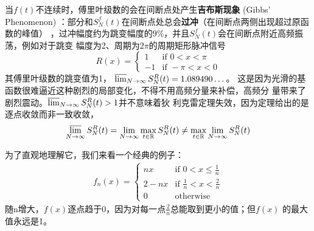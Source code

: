 \documentclass{ctexbook}
\begin{document}
当$f(t)$不连续时，傅里叶级数的会在间断点处产生\textbf{吉布斯现象} (Gibbs' Phenomenon)
：部分和$S_N^f(t)$在间断点处总会\textbf{过冲}（在间断点两侧出现超过原函数的峰值）
，过冲幅度约为跳变幅度的9\%，并且$S_N^f(t)$会在间断点附近高频振荡，例如对于跳变
幅度为2、周期为$2\pi$的周期矩形脉冲信号
\[R(x) =
    \begin{cases}
        1  & \text{if } 0<x<\pi  \\
        -1 & \text{if } -\pi<x<0
    \end{cases}\]
其傅里叶级数的跳变值为1，
$\varlimsup_{N \to \infty}S_N^R(t)=1.089490 \dots$。
这是因为光滑的基函数很难逼近这种剧烈的局部变化，不得不用高频分量来补偿，高频分
量带来了剧烈震动。$\varlimsup_{N \to \infty}S_N^R(t)>1$并不意味着狄
利克雷定理失效，因为定理给出的是逐点收敛而非一致收敛，
\[\varlimsup_{N \to \infty}S_N^R(t)=\lim_{N \to \infty}\max_{t\in \mathbb{R} }S_N^R(t)\neq \max_{t\in\mathbb{R}}\lim_{N\to\infty}S_N^R(t)\]

为了直观地理解它，我们来看一个经典的例子：
\begin{align*}
    f_n(x)=
    \begin{cases}
        nx   & \text{if } 0<x\leq\frac{1}{n}        \\
        2-nx & \text{if } \frac{1}{n}<x<\frac{2}{n} \\
        0    & \text{otherwise}
    \end{cases}
\end{align*}
随n增大，$f(x)$逐点趋于0，因为对每一点$\frac{2}{n}$总能取到更小的值；但$f(x)$
的最大值永远是1。
\end{document}
